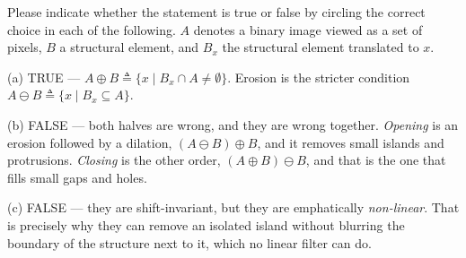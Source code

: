 \documentclass[11pt]{exam}
\newcommand{\TFT}{\ifprintanswers\textbf{TRUE}\hspace{1.1em}False\else True\hspace{1.1em}False\fi}
\newcommand{\TFF}{True\hspace{1.1em}\ifprintanswers\textbf{FALSE}\else False\fi}
\begin{document}
\begin{questions}
\question
Please indicate whether the statement is true or false by circling the correct choice in each of
the following. $A$ denotes a binary image viewed as a set of pixels, $B$ a structural element, and
$B_x$ the structural element translated to $x$.


\begin{solution}
  (a) TRUE --- $A \oplus B \triangleq \{x \mid B_x \cap A \neq \emptyset\}$. Erosion is the
  stricter condition $A \ominus B \triangleq \{x \mid B_x \subseteq A\}$.

  (b) FALSE --- both halves are wrong, and they are wrong together. \emph{Opening} is an erosion
  followed by a dilation, $(A \ominus B) \oplus B$, and it removes small islands and protrusions.
  \emph{Closing} is the other order, $(A \oplus B) \ominus B$, and that is the one that fills small
  gaps and holes.

  (c) FALSE --- they are shift-invariant, but they are emphatically \emph{non-linear}. That is
  precisely why they can remove an isolated island without blurring the boundary of the structure
  next to it, which no linear filter can do.


\end{solution}
\end{questions}
\end{document}
